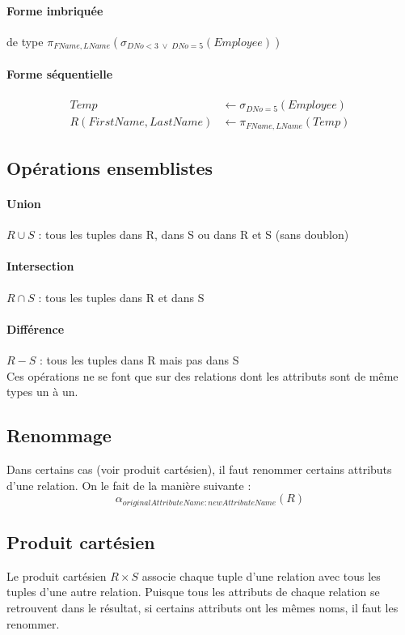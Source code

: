 \documentclass[a4paper]{article}
\begin{document}
  \paragraph{Forme imbriquée} de type $ \pi_{FName, LName}(\sigma_{DNo<3\; \lor\; DNo=5 }(Employee))$

  \paragraph{Forme séquentielle}
  \begin{align*}
    Temp &\leftarrow \sigma_{DNo=5}(Employee)\\
    R(FirstName, LastName) &\leftarrow \pi_{FName, LName}(Temp)
  \end{align*}

  \subsection{Opérations ensemblistes}

  \paragraph{Union} $R \cup S$ : tous les tuples dans R, dans S ou dans R et S (sans doublon)

  \paragraph{Intersection} $R \cap S$ : tous les tuples dans R et dans S

  \paragraph{Différence} $R - S$ : tous les tuples dans R mais pas dans S\\

  Ces opérations ne se font que sur des relations dont les attributs sont
  de même types un à un.

  \subsection{Renommage}
  Dans certains cas (voir produit cartésien), il faut renommer certains attributs
  d'une relation. On le fait de la manière suivante :
  $$ \alpha_{originalAttributeName:newAttributeName}(R) $$

  \subsection{Produit cartésien}
  Le produit cartésien $R \times S$ associe chaque tuple d'une relation avec tous les tuples
  d'une autre relation. Puisque tous les attributs de chaque relation se retrouvent
  dans le résultat, si certains attributs ont les mêmes noms, il faut les renommer.
\end{document}
